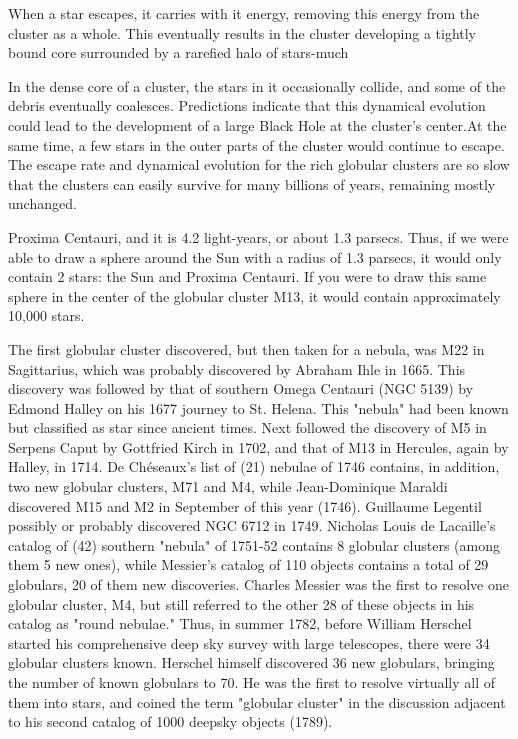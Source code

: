 When a star escapes, it carries with it energy, removing this energy from the cluster as a whole. This eventually results in the cluster developing a tightly bound core surrounded by a rarefied halo of stars-much

In the dense core of a cluster, the stars in it occasionally collide, and some of the debris eventually coalesces. Predictions indicate that this dynamical evolution could lead to the development of a large Black Hole at the cluster's center.At the same time, a few stars in the outer parts of the cluster would continue to escape. The escape rate and dynamical evolution for the rich globular clusters are so slow that the clusters can easily survive for many billions of years, remaining mostly unchanged.

Proxima Centauri, and it is 4.2 light-years, or about 1.3 parsecs. Thus, if we were able to draw a sphere around the Sun with a radius of 1.3 parsecs, it would only contain 2 stars: the Sun and Proxima Centauri. If you were to draw this same sphere in the center of the globular cluster M13, it would contain approximately 10,000 stars.

The first globular cluster discovered, but then taken for a nebula, was M22 in Sagittarius, which was probably discovered by Abraham Ihle in 1665. This discovery was followed by that of southern Omega Centauri (NGC 5139) by Edmond Halley on his 1677 journey to St. Helena. This "nebula" had been known but classified as star since ancient times. Next followed the discovery of M5 in Serpens Caput by Gottfried Kirch in 1702, and that of M13 in Hercules, again by Halley, in 1714. De Chéseaux's list of (21) nebulae of 1746 contains, in addition, two new globular clusters, M71 and M4, while Jean-Dominique Maraldi discovered M15 and M2 in September of this year (1746). Guillaume Legentil possibly or probably discovered NGC 6712 in 1749. Nicholas Louis de Lacaille's catalog of (42) southern "nebula" of 1751-52 contains 8 globular clusters (among them 5 new ones), while Messier's catalog of 110 objects contains a total of 29 globulars, 20 of them new discoveries. Charles Messier was the first to resolve one globular cluster, M4, but still referred to the other 28 of these objects in his catalog as "round nebulae." Thus, in summer 1782, before William Herschel started his comprehensive deep sky survey with large telescopes, there were 34 globular clusters known. Herschel himself discovered 36 new globulars, bringing the number of known globulars to 70. He was the first to resolve virtually all of them into stars, and coined the term "globular cluster" in the discussion adjacent to his second catalog of 1000 deepsky objects (1789).

